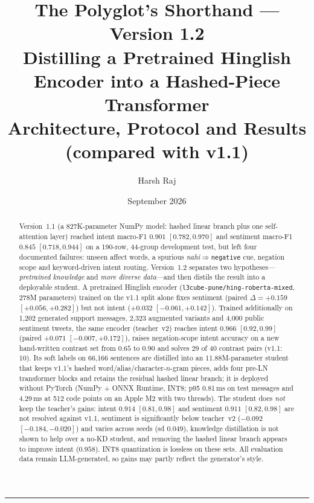 \documentclass[11pt,a4paper]{article}
\title{\vspace{-1.2em}\textbf{The Polyglot's Shorthand --- Version 1.2}\\[0.3em]
  \large Distilling a Pretrained Hinglish Encoder into a Hashed-Piece Transformer\\[0.4em]
  \normalsize\color{muted}Architecture, Protocol and Results (compared with v1.1)}
\author{Harsh Raj}
\date{September 2026}
\theoremstyle{remark}
\newcommand{\lbl}[1]{\texttt{#1}}
\newcommand{\hi}[1]{\textit{#1}}
\begin{document}
\maketitle

\begin{abstract}
\noindent
Version~1.1 (a 827K-parameter NumPy model: hashed linear branch plus one
self-attention layer) reached intent macro-F1 $0.901$ $[0.782, 0.970]$ and
sentiment macro-F1 $0.845$ $[0.718, 0.944]$ on a 190-row, 44-group development
test, but left four documented failures: unseen affect words, a spurious
\hi{nahi}$\Rightarrow$\lbl{negative} cue, negation scope and keyword-driven
intent routing. Version~1.2 separates two hypotheses---\emph{pretrained
knowledge} and \emph{more diverse data}---and then distils the result into a
deployable student. A pretrained Hinglish encoder
(\lbl{l3cube-pune/hing-roberta-mixed}, 278M parameters) trained on the v1.1
split alone fixes sentiment (paired $\Delta = +0.159$ $[+0.056, +0.282]$) but
not intent ($+0.032$ $[-0.061, +0.142]$). Trained additionally on 1{,}202
generated support messages, 2{,}323 augmented variants and 4{,}000 public
sentiment tweets, the same encoder (teacher~v2) reaches intent $0.966$
$[0.92, 0.99]$ (paired $+0.071$ $[-0.007, +0.172]$), raises negation-scope
intent accuracy on a new hand-written contrast set from $0.65$ to $0.90$ and
solves 29 of 40 contrast pairs (v1.1: 10). Its soft labels on 66{,}166
sentences are distilled into an 11.88M-parameter student that keeps v1.1's
hashed word/alias/character-$n$-gram pieces, adds four pre-LN transformer
blocks and retains the residual hashed linear branch; it is deployed without
PyTorch (NumPy + ONNX Runtime, INT8; p95 0.81\,ms on test messages and
4.29\,ms at 512 code points on an Apple M2 with two threads). The student does
\emph{not} keep the teacher's gains: intent $0.914$ $[0.81, 0.98]$ and
sentiment $0.911$ $[0.82, 0.98]$ are not resolved against v1.1, sentiment is
significantly below teacher~v2 ($-0.092$ $[-0.184, -0.020]$) and varies across
seeds (sd $0.049$), knowledge distillation is not shown to help over a no-KD
student, and removing the hashed linear branch appears to improve intent
($0.958$). INT8 quantization is lossless on these sets. All evaluation data
remain LLM-generated, so gains may partly reflect the generator's style.
\end{abstract}

\tableofcontents
\vspace{1em}\hrule

\end{document}
